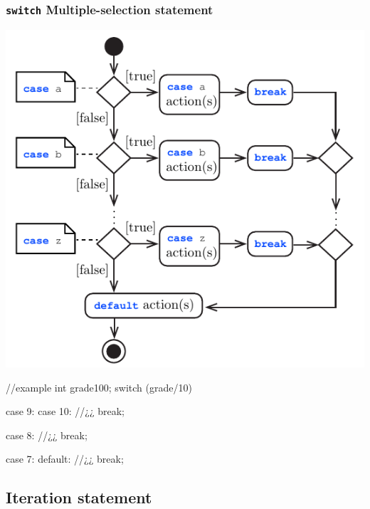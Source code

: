 \subsubsection{\texttt{switch} Multiple-selection statement}

\begin{minipage}{.65\textwidth}
\centering
\includegraphics[width=0.75\linewidth]{01_Basics/figures/uml/SelectionStatement-01-UML-switch.pdf}
\label{fig:ch01_Basics_UML_SelStatement-01-switch}
\end{minipage}
\begin{minipage}{.25\textwidth}
\begin{CPPCode}
//example
int grade{100};
switch (grade/10)
{
    case 9:
    case 10:
        //¿¿
        break;
    
    case 8:
        //¿¿
        break;
        
    case 7:
    default:
        //¿¿
        break;
}
\end{CPPCode}
\end{minipage}
\vspace{0.5cm}



\subsection{Iteration statement}
